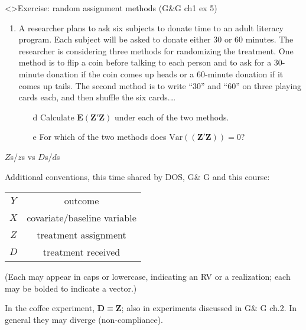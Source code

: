 \begin{frame}<\nottheirhandout>{Exercise: random assignment methods}
{\footnotesize (G\&G ch1 ex 5)}

\begin{enumerate}\addtocounter{enumi}{-1}
\item 
A researcher plans to ask six subjects to donate time to an adult
literacy program. Each subject will be asked to donate either 30 or 60
minutes. The researcher is considering three methods for randomizing
the treatment. One method is to flip a coin before talking to each
person and to ask for a 30-minute donation if the coin comes up heads
or a 60-minute donation if it comes up tails. The second method is to
write ``30'' and ``60'' on three playing cards each, and then shuffle
the six cards.\ldots

\begin{itemize}
\item[d] Calculate $\mathbf{E}(\mathbf{Z}'\mathbf{Z})$ under each of the two methods.
\item[e] For which of the two methods does $\mathrm{Var}((\mathbf{Z}'\mathbf{Z})) = 0$?
\end{itemize}
\end{enumerate}
\vfill

\end{frame}


\begin{frame}{$Z$s/$z$s vs $D$s/$d$s}
  
Additional conventions, this time shared by DOS, G\& G and this course:

\begin{tabular}{cc}
  $Y$ & outcome \\
  $X$ & covariate/baseline variable\\
  $Z$ & treatment assignment\\
  $D$ & treatment received \\
\end{tabular}
\pause

(Each may appear in caps or lowercase, indicating an RV or a realization; each may be bolded to indicate a vector.) \pause

In the coffee experiment, $\mathbf{D} \equiv \mathbf{Z}$; also in experiments discussed in G\& G ch.2.  In general they may diverge (non-compliance). 

\end{frame}

